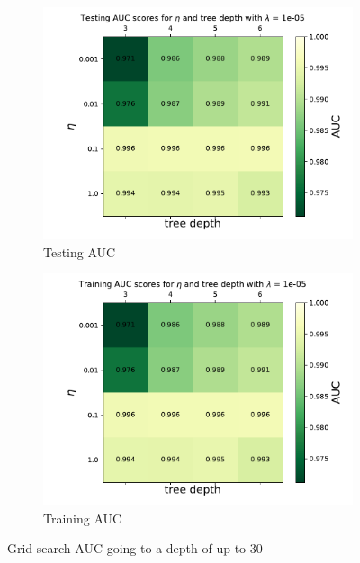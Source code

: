 \documentclass[14pt, a4paper]{book}
\begin{document}
\graphicspath{{../../../Plots/XGBoost/FULL/GRIDSEARCH_24-30}}
\begin{figure}[!ht]
\centering
\begin{subfigure}[b]{0.49\textwidth}
      \centering
      \includegraphics[width=1\textwidth]{Testing_AUC.pdf}
      \caption{Testing AUC}
   \end{subfigure}
   \hfill
   \begin{subfigure}[b]{0.49\textwidth}
      \centering
      \includegraphics[width=1\textwidth]{Training_AUC.pdf}
      \caption{Training AUC}
   \end{subfigure}
   \caption{Grid search AUC going to a depth of up to 30}\label{fig:DBDT_GRID_AUC}
\end{figure}
\end{document}
